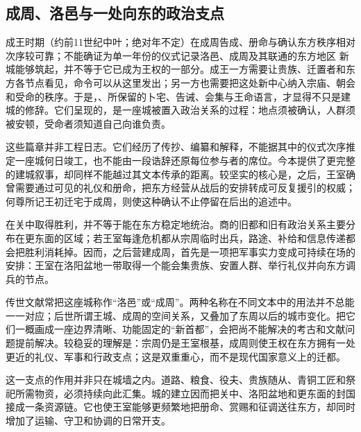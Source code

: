 \subsection{成周、洛邑与一处向东的政治支点}

\begin{event}{成王时期（约前11世纪中叶；绝对年不定）}{在成周告成、册命与确认东方秩序}{相对次序较可靠；不能确证为单一年份的仪式记录}{洛邑、成周及其联通的东方地区}
新城能够筑起，并不等于它已成为王权的一部分。成王一方需要让贵族、迁置者和东方各节点看见，命令可以从这里发出；另一方也需要把这处新中心纳入宗庙、朝会和受命的秩序。于是，、所保留的卜宅、告诫、会集与王命语言，才显得不只是建城的修辞。它们呈现的，是一座城被置入政治关系的过程：地点须被确认，人群须被安顿，受命者须知道自己向谁负责。

这些篇章并非工程日志。它们经历了传抄、编纂和解释，不能据其中的仪式次序推定一座城何日竣工，也不能由一段诰辞还原每位参与者的席位。今本提供了更完整的建城叙事，却同样不能越过其文本传承的距离。较坚实的核心是，之后，王室确曾需要通过可见的礼仪和册命，把东方经营从战后的安排转成可反复援引的权威；何尊所记王初迁宅于成周，则使这种确认不止停留在后出的追述中。
\end{event}

在关中取得胜利，并不等于能在东方稳定地统治。商的旧都和旧有政治关系主要分布在更东面的区域；若王室每逢危机都从宗周临时出兵，路途、补给和信息传递都会把胜利消耗掉。因而，之后营建成周，首先是一项把军事实力变成可持续在场的安排：王室在洛阳盆地一带取得一个能会集贵族、安置人群、举行礼仪并向东方调兵的节点。

传世文献常把这座城称作“洛邑”或“成周”。两种名称在不同文本中的用法并不总能一一对应；后世所谓王城、成周的空间关系，又叠加了东周以后的城市变化。把它们一概画成一座边界清晰、功能固定的“新首都”，会把尚不能解决的考古和文献问题提前解决。较稳妥的理解是：宗周仍是王室根基，成周则使王权在东方拥有一处更近的礼仪、军事和行政支点；这是双重重心，而不是现代国家意义上的迁都。

这一支点的作用并非只在城墙之内。道路、粮食、役夫、贵族随从、青铜工匠和祭祀所需物资，必须持续向此汇集。城的建立因而把关中、洛阳盆地和更东面的封国接成一条资源链。它也使王室能够更频繁地把册命、赏赐和征调送往东方，却同时增加了运输、守卫和协调的日常开支。

